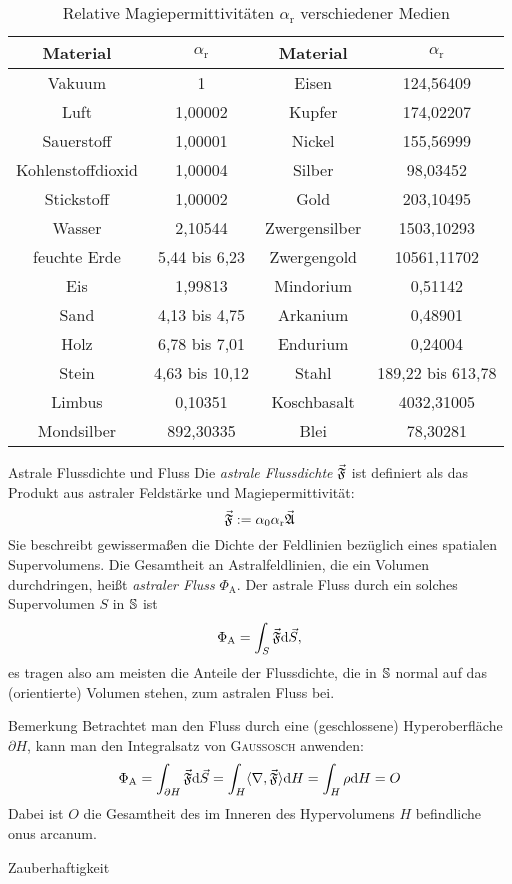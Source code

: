 \begin{table}[htb]
	\centering
		\begin{tabular}{c|c||c|c}
			Material&$\alpha_\text{r}$&Material&$\alpha_\text{r}$\\\hline\hline
			Vakuum&1&Eisen&124,56409\\\hline
			Luft&1,00002&Kupfer&174,02207\\\hline
			Sauerstoff&1,00001&Nickel&155,56999\\\hline
			Kohlenstoffdioxid&1,00004&Silber&98,03452\\\hline
			Stickstoff&1,00002&Gold&203,10495\\\hline
			Wasser&2,10544&Zwergensilber&1503,10293\\\hline
			feuchte Erde&5,44 bis 6,23&Zwergengold&10561,11702\\\hline
			Eis&1,99813&Mindorium&0,51142\\\hline
			Sand&4,13 bis 4,75&Arkanium&0,48901\\\hline
			Holz&6,78 bis 7,01&Endurium&0,24004\\\hline
			Stein&4,63 bis 10,12&Stahl&189,22 bis 613,78\\\hline
			Limbus&0,10351&Koschbasalt&4032,31005\\\hline
			Mondsilber&892,30335&Blei&78,30281
		\end{tabular}
	\caption{Relative Magiepermittivitäten $\alpha_\text{r}$ verschiedener Medien}
	\label{tab:permitt}
\end{table}
\begin{bla}{Astrale Flussdichte und Fluss}
Die \emph{astrale Flussdichte} $\vec{\mathfrak{F}}$ ist definiert als das Produkt aus astraler Feldstärke und Magiepermittivität:
\begin{equation}
\vec{\mathfrak{F}}:=\alpha_0\alpha_\text{r}\vec{\mathfrak{A}}
\end{equation}
Sie beschreibt gewissermaßen die Dichte der Feldlinien bezüglich eines spatialen Supervolumens. Die Gesamtheit an Astralfeldlinien, die ein Volumen durchdringen, heißt \emph{astraler Fluss} $\Phi_\text{A}$. Der astrale Fluss durch ein solches Supervolumen $S$ in $\mathbb{S}$ ist
\begin{equation}
\Phi_\text{A}=\int_{S}\vec{\mathfrak{F}}\text{\rmfamily d} \vec{S},
\end{equation}
es tragen also am meisten die Anteile der Flussdichte, die in $\mathbb{S}$ normal auf das (orientierte) Volumen stehen, zum astralen Fluss bei.
\end{bla}
\begin{bla}{Bemerkung}
Betrachtet man den Fluss durch eine (geschlossene) Hyperoberfläche $\partial H$, kann man den Integralsatz von \textsc{Gaußosch} anwenden:
\begin{equation}
\Phi_\text{A}=\int_{\partial H}\vec{\mathfrak{F}}\text{\rmfamily d} \vec{S}=\int_H\langle\nabla,\vec{\mathfrak{F}}\rangle\text{\rmfamily d} H=\int_H\rho\text{\rmfamily d} H=O
\end{equation}
Dabei ist $O$ die Gesamtheit des im Inneren des Hypervolumens $H$ befindliche onus arcanum.
\end{bla}
\begin{bla}{Zauberhaftigkeit}
\end{bla}